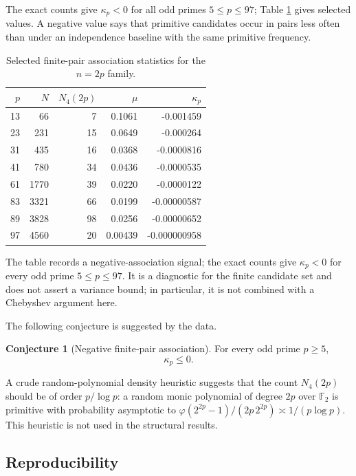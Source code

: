 \documentclass[11pt]{article}
\theoremstyle{definition}
\newtheorem{conjecture}[theorem]{Conjecture}
\theoremstyle{remark}
\begin{document}
The exact counts give $\kappa_p<0$ for all odd primes $5\le p\le97$;
Table \ref{tab:assoc} gives selected values. A negative value says that
primitive candidates occur in pairs less often than under an independence
baseline with the same primitive frequency.

\begin{table}[ht]
\centering
\small
\begin{tabular}{rrrrr}
\toprule
$p$ & $N$ & $N_4(2p)$ & $\mu$ & $\kappa_p$\\
\midrule
13 & 66 & 7 & 0.1061 & -0.001459\\
23 & 231 & 15 & 0.0649 & -0.000264\\
31 & 435 & 16 & 0.0368 & -0.0000816\\
41 & 780 & 34 & 0.0436 & -0.0000535\\
61 & 1770 & 39 & 0.0220 & -0.0000122\\
83 & 3321 & 66 & 0.0199 & -0.00000587\\
89 & 3828 & 98 & 0.0256 & -0.00000652\\
97 & 4560 & 20 & 0.00439 & -0.000000958\\
\bottomrule
\end{tabular}
\caption{Selected finite-pair association statistics for the $n=2p$ family.}
\label{tab:assoc}
\end{table}

The table records a negative-association signal; the exact counts give \(\kappa_p<0\) for every odd prime \(5\le p\le97\).
It is a diagnostic for the finite candidate set and does not assert a variance
bound; in particular, it is not combined with a Chebyshev argument here.

The following conjecture is suggested by the data.

\begin{conjecture}[Negative finite-pair association]\label{conj:negcorr}
For every odd prime $p\ge5$,
\[
\kappa_p\le0.
\]
\end{conjecture}

A crude random-polynomial density heuristic suggests that the count
$N_4(2p)$ should be of order $p/\log p$: a random monic polynomial of degree
$2p$ over $\mathbb F_2$ is primitive with probability asymptotic to
$\varphi(2^{2p}-1)/(2p\,2^{2p})\asymp 1/(p\log p)$. This heuristic is not used
in the structural results.

\subsection{Reproducibility}
\end{document}
